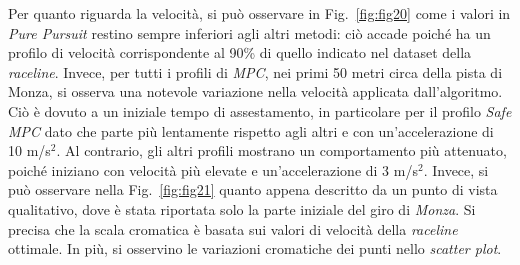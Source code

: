 Per quanto riguarda la velocità, si può osservare in Fig.~\ref{fig:fig20}
come i valori in \textit{Pure Pursuit} restino sempre inferiori agli
altri metodi: ciò accade poiché ha un profilo di velocità corrispondente al
90\% di quello indicato nel dataset della \textit{raceline}. Invece, per tutti
i profili di \textit{MPC}, nei primi 50 metri circa della pista di Monza,
si osserva una notevole variazione nella velocità applicata dall'algoritmo. 
Ciò è dovuto a un iniziale tempo di assestamento, in particolare per il profilo
\textit{Safe MPC} dato che parte più lentamente rispetto agli altri e con
un'accelerazione di 10 m/s$^2$.
Al contrario, gli altri profili mostrano un comportamento più attenuato, poiché
iniziano con velocità più elevate e un'accelerazione di 3 m/s$^2$.
Invece, si può osservare nella Fig.~\ref{fig:fig21} quanto appena descritto da un punto
di vista qualitativo, dove è stata riportata solo la parte iniziale del giro di 
\textit{Monza}. Si precisa che la scala cromatica è basata sui valori di velocità
della \textit{raceline} ottimale. In più, si osservino le variazioni cromatiche dei punti nello \textit{scatter plot}.

